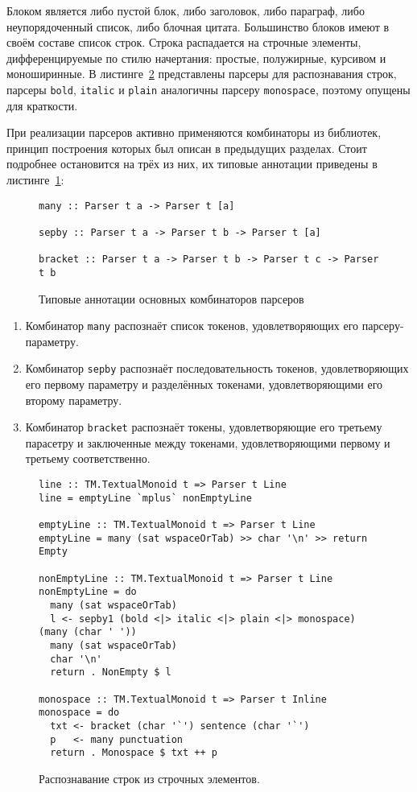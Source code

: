 Блоком является либо пустой блок, либо заголовок, либо параграф, либо неупорядоченный список, либо блочная цитата. Большинство блоков имеют в своём составе список строк. Строка распадается на строчные элементы, дифференцируемые по стилю начертания: простые, полужирные, курсивом и моноширинные. В листинге~\ref{listing:MarkdownInline} представлены парсеры для распознавания строк, парсеры \lstinline{bold}, \lstinline{italic} и \lstinline{plain} аналогичны парсеру \lstinline{monospace}, поэтому опущены для краткости.

При реализации парсеров активно применяются комбинаторы из библиотек, принцип построения которых был описан в предыдущих разделах. Стоит подробнее остановится на трёх из них, их типовые аннотации приведены в листинге~\ref{listing:ParserCombinators}:

\begin{figure}[h]
\begin{lstlisting}
many :: Parser t a -> Parser t [a]

sepby :: Parser t a -> Parser t b -> Parser t [a]

bracket :: Parser t a -> Parser t b -> Parser t c -> Parser t b
\end{lstlisting}
\caption{Типовые аннотации основных комбинаторов парсеров}
\label{listing:ParserCombinators}
\end{figure}

\begin{enumerate}
  \item Комбинатор \lstinline{many} распознаёт список токенов, удовлетворяющих его парсеру-параметру.
  \item Комбинатор \lstinline{sepby} распознаёт последовательность токенов, удовлетворяющих его первому параметру и разделённых токенами, удовлетворяющими его второму параметру.
  \item Комбинатор \lstinline{bracket} распознаёт токены, удовлетворяющие его третьему парасетру и заключенные между токенами, удовлетворяющими первому и третьему соответственно.
\end{enumerate}

\begin{figure}[t]
\begin{lstlisting}
line :: TM.TextualMonoid t => Parser t Line
line = emptyLine `mplus` nonEmptyLine

emptyLine :: TM.TextualMonoid t => Parser t Line
emptyLine = many (sat wspaceOrTab) >> char '\n' >> return Empty

nonEmptyLine :: TM.TextualMonoid t => Parser t Line
nonEmptyLine = do
  many (sat wspaceOrTab)
  l <- sepby1 (bold <|> italic <|> plain <|> monospace) (many (char ' '))
  many (sat wspaceOrTab)
  char '\n'
  return . NonEmpty $ l

monospace :: TM.TextualMonoid t => Parser t Inline
monospace = do
  txt <- bracket (char '`') sentence (char '`')
  p   <- many punctuation
  return . Monospace $ txt ++ p
\end{lstlisting}
\caption{Распознавание строк из строчных элементов.}
\label{listing:MarkdownInline}
\end{figure}

